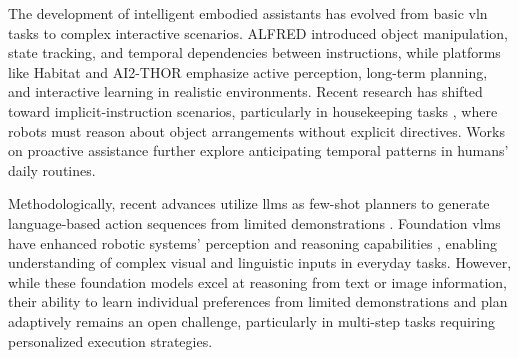 The development of intelligent embodied assistants has evolved from basic \ac{vln} tasks \citep{anderson2018vision,chen2019touchdown,thomason2020vision} to complex interactive scenarios. ALFRED \citep{shridhar2020alfred} introduced object manipulation, state tracking, and temporal dependencies between instructions, while platforms like Habitat \citep{savva2019habitat,puig2023habitat} and AI2-THOR \citep{kolve2017ai2} emphasize active perception, long-term planning, and interactive learning in realistic environments. Recent research has shifted toward implicit-instruction scenarios, particularly in housekeeping tasks \citep{kapelyukh2022my,kant2022housekeep,sarch2022tidee,wu2023tidybot}, where robots must reason about object arrangements without explicit directives. Works on proactive assistance \citep{patel2023proactive,patel2023predicting,puig2023nopa} further explore anticipating temporal patterns in humans' daily routines.

Methodologically, recent advances utilize \acp{llm} as few-shot planners to generate language-based action sequences from limited demonstrations \citep{song2023llm,driess2023palm,ding2023integrating,zhang2023building}. Foundation \acp{vlm} have enhanced robotic systems' perception and reasoning capabilities \citep{ahn2024autort,leal2023sara,gu2023rt,brohan2022rt,zitkovich2023rt,xu2024active}, enabling understanding of complex visual and linguistic inputs in everyday tasks. However, while these foundation models excel at reasoning from text or image information, their ability to learn individual preferences from limited demonstrations and plan adaptively remains an open challenge, particularly in multi-step tasks requiring personalized execution strategies.